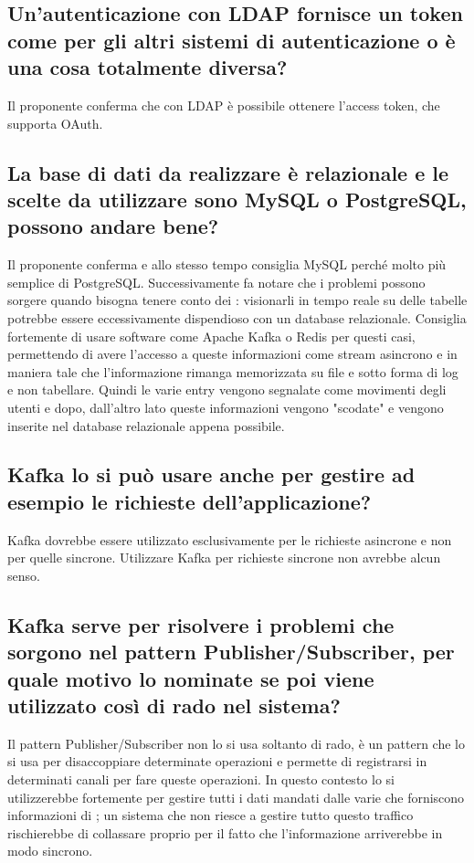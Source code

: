 \subsection{Un'autenticazione con LDAP fornisce un token come per gli altri sistemi di autenticazione o è una cosa totalmente diversa?}
Il proponente conferma che con LDAP è possibile ottenere l'access token, che supporta OAuth.

\subsection{La base di dati da realizzare è relazionale e le scelte da utilizzare sono MySQL o PostgreSQL, possono andare bene?}
Il proponente conferma e allo stesso tempo consiglia MySQL perché molto più semplice di PostgreSQL. Successivamente fa notare che i problemi possono sorgere quando bisogna tenere conto dei : visionarli in tempo reale su delle tabelle potrebbe essere eccessivamente dispendioso con un database relazionale.
Consiglia fortemente di usare software come Apache Kafka o Redis per questi casi, permettendo di avere l'accesso a queste informazioni come stream asincrono e in maniera tale che l'informazione rimanga memorizzata su file e 
sotto forma di log e non tabellare. Quindi le varie entry vengono segnalate come movimenti degli utenti e dopo, dall'altro lato queste informazioni vengono "scodate" e vengono inserite nel database relazionale appena possibile.

\subsection{Kafka lo si può usare anche per gestire ad esempio le richieste dell'applicazione?}
Kafka dovrebbe essere utilizzato esclusivamente per le richieste asincrone e non per quelle sincrone. Utilizzare Kafka per richieste sincrone non avrebbe alcun senso.

\subsection{Kafka serve per risolvere i problemi che sorgono nel pattern Publisher/Subscriber, per quale motivo lo nominate se poi viene utilizzato così di rado nel sistema?}
Il pattern Publisher/Subscriber non lo si usa soltanto di rado, è un pattern che lo si usa per disaccoppiare determinate operazioni e permette di registrarsi in determinati canali per fare queste operazioni.
In questo contesto lo si utilizzerebbe fortemente per gestire tutti i dati mandati dalle varie  che forniscono informazioni di ; un sistema 
che non riesce a gestire tutto questo traffico rischierebbe di collassare proprio per il fatto che l'informazione arriverebbe in modo sincrono.


